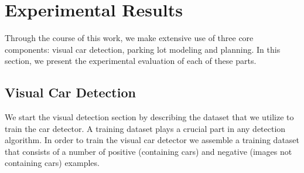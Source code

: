 
\chapter{Experimental Results}
\label{cha:experimental_results}

Through the course of this work, we make extensive use of three core
components: visual car detection, parking lot modeling and planning. In this
section, we present the experimental evaluation of each of these parts.

\section{Visual Car Detection}
\label{sec:visual_car_detection}

We start the visual detection section by describing the dataset that we
utilize to train the car detector. A training dataset plays a crucial part in
any detection algorithm. In order to train the visual car detector we assemble
a training dataset that consists of a number of positive (containing cars) and
negative (images not containing cars) examples.

